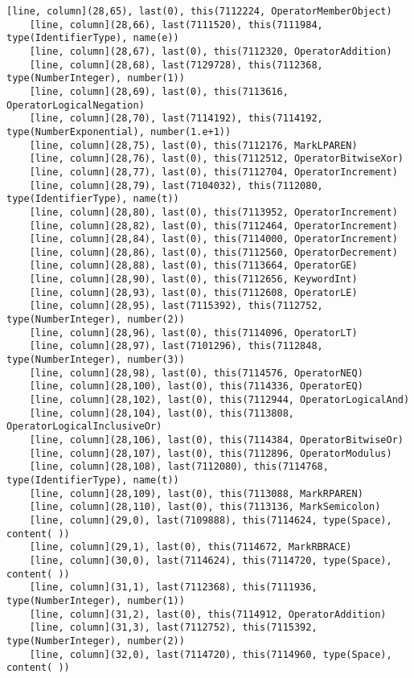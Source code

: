 \documentclass[UTF8]{ctexart}
\begin{document}
{\begin{lstlisting}[language={[ANSI]C++}]
    [line, column](28,65), last(0), this(7112224, OperatorMemberObject)
    [line, column](28,66), last(7111520), this(7111984, type(IdentifierType), name(e))
    [line, column](28,67), last(0), this(7112320, OperatorAddition)
    [line, column](28,68), last(7129728), this(7112368, type(NumberInteger), number(1))
    [line, column](28,69), last(0), this(7113616, OperatorLogicalNegation)
    [line, column](28,70), last(7114192), this(7114192, type(NumberExponential), number(1.e+1))
    [line, column](28,75), last(0), this(7112176, MarkLPAREN)
    [line, column](28,76), last(0), this(7112512, OperatorBitwiseXor)
    [line, column](28,77), last(0), this(7112704, OperatorIncrement)
    [line, column](28,79), last(7104032), this(7112080, type(IdentifierType), name(t))
    [line, column](28,80), last(0), this(7113952, OperatorIncrement)
    [line, column](28,82), last(0), this(7112464, OperatorIncrement)
    [line, column](28,84), last(0), this(7114000, OperatorIncrement)
    [line, column](28,86), last(0), this(7112560, OperatorDecrement)
    [line, column](28,88), last(0), this(7113664, OperatorGE)
    [line, column](28,90), last(0), this(7112656, KeywordInt)
    [line, column](28,93), last(0), this(7112608, OperatorLE)
    [line, column](28,95), last(7115392), this(7112752, type(NumberInteger), number(2))
    [line, column](28,96), last(0), this(7114096, OperatorLT)
    [line, column](28,97), last(7101296), this(7112848, type(NumberInteger), number(3))
    [line, column](28,98), last(0), this(7114576, OperatorNEQ)
    [line, column](28,100), last(0), this(7114336, OperatorEQ)
    [line, column](28,102), last(0), this(7112944, OperatorLogicalAnd)
    [line, column](28,104), last(0), this(7113808, OperatorLogicalInclusiveOr)
    [line, column](28,106), last(0), this(7114384, OperatorBitwiseOr)
    [line, column](28,107), last(0), this(7112896, OperatorModulus)
    [line, column](28,108), last(7112080), this(7114768, type(IdentifierType), name(t))
    [line, column](28,109), last(0), this(7113088, MarkRPAREN)
    [line, column](28,110), last(0), this(7113136, MarkSemicolon)
    [line, column](29,0), last(7109888), this(7114624, type(Space), content( ))
    [line, column](29,1), last(0), this(7114672, MarkRBRACE)
    [line, column](30,0), last(7114624), this(7114720, type(Space), content( ))
    [line, column](31,1), last(7112368), this(7111936, type(NumberInteger), number(1))
    [line, column](31,2), last(0), this(7114912, OperatorAddition)
    [line, column](31,3), last(7112752), this(7115392, type(NumberInteger), number(2))
    [line, column](32,0), last(7114720), this(7114960, type(Space), content( ))

\end{lstlisting}}
\end{document}

